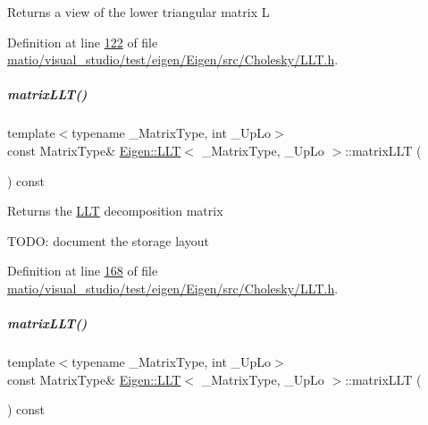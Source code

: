 \begin{DoxyReturn}{Returns}
a view of the lower triangular matrix L 
\end{DoxyReturn}


Definition at line \hyperlink{matio_2visual__studio_2test_2eigen_2_eigen_2src_2_cholesky_2_l_l_t_8h_source_l00122}{122} of file \hyperlink{matio_2visual__studio_2test_2eigen_2_eigen_2src_2_cholesky_2_l_l_t_8h_source}{matio/visual\+\_\+studio/test/eigen/\+Eigen/src/\+Cholesky/\+L\+L\+T.\+h}.

\mbox{\label{group___cholesky___module_af62881fc95c7e54a93b63c20f2c62b46}} 
\subparagraph{\texorpdfstring{matrix\+L\+L\+T()}{matrixLLT()}\hspace{0.1cm}{\footnotesize\ttfamily [1/2]}}
{\footnotesize\ttfamily template$<$typename \+\_\+\+Matrix\+Type, int \+\_\+\+Up\+Lo$>$ \\
const Matrix\+Type\& \hyperlink{group___cholesky___module_class_eigen_1_1_l_l_t}{Eigen\+::\+L\+LT}$<$ \+\_\+\+Matrix\+Type, \+\_\+\+Up\+Lo $>$\+::matrix\+L\+LT (\begin{DoxyParamCaption}{ }\end{DoxyParamCaption}) const\hspace{0.3cm}{\ttfamily [inline]}}

\begin{DoxyReturn}{Returns}
the \hyperlink{group___cholesky___module_class_eigen_1_1_l_l_t}{L\+LT} decomposition matrix
\end{DoxyReturn}
T\+O\+DO\+: document the storage layout 

Definition at line \hyperlink{matio_2visual__studio_2test_2eigen_2_eigen_2src_2_cholesky_2_l_l_t_8h_source_l00168}{168} of file \hyperlink{matio_2visual__studio_2test_2eigen_2_eigen_2src_2_cholesky_2_l_l_t_8h_source}{matio/visual\+\_\+studio/test/eigen/\+Eigen/src/\+Cholesky/\+L\+L\+T.\+h}.

\mbox{\label{group___cholesky___module_af62881fc95c7e54a93b63c20f2c62b46}} 
\subparagraph{\texorpdfstring{matrix\+L\+L\+T()}{matrixLLT()}\hspace{0.1cm}{\footnotesize\ttfamily [2/2]}}
{\footnotesize\ttfamily template$<$typename \+\_\+\+Matrix\+Type, int \+\_\+\+Up\+Lo$>$ \\
const Matrix\+Type\& \hyperlink{group___cholesky___module_class_eigen_1_1_l_l_t}{Eigen\+::\+L\+LT}$<$ \+\_\+\+Matrix\+Type, \+\_\+\+Up\+Lo $>$\+::matrix\+L\+LT (\begin{DoxyParamCaption}{ }\end{DoxyParamCaption}) const\hspace{0.3cm}{\ttfamily [inline]}}

